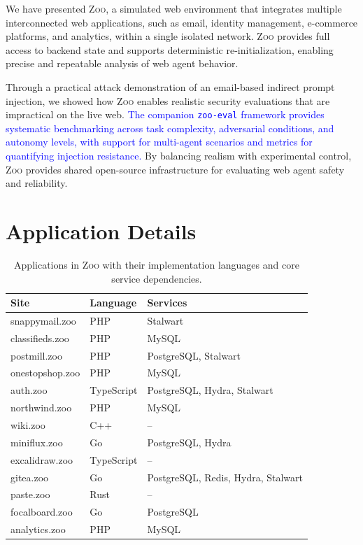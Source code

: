 \documentclass{article} %
\newcommand{\maricolor}{blue}
\newcommand{\zoo}{\textsc{Zoo}}
\begin{document}
We have presented \zoo{}, a simulated web environment that integrates multiple interconnected web applications, such as email, identity management, e-commerce platforms, and analytics, within a single isolated network.
\zoo{} provides full access to backend state and supports deterministic re-initialization, enabling precise and repeatable analysis of web agent behavior.

Through a practical attack demonstration of an email-based indirect prompt injection, we showed how \zoo{} enables realistic security evaluations that are impractical on the live web.
\textcolor{\maricolor}{The companion \texttt{zoo-eval} framework provides systematic benchmarking across task complexity, adversarial conditions, and autonomy levels, with support for multi-agent scenarios and metrics for quantifying injection resistance.}
By balancing realism with experimental control, \zoo{} provides shared open-source infrastructure for evaluating web agent safety and reliability.




\appendix
\label{appendix}

\section{Application Details}

\begin{table}[h]
\centering
\begin{tabular}{@{}lll@{}}
\toprule
\textbf{Site} & \textbf{Language} & \textbf{Services} \\
\midrule
snappymail.zoo & PHP & Stalwart \\
classifieds.zoo & PHP & MySQL \\
postmill.zoo & PHP & PostgreSQL, Stalwart \\
onestopshop.zoo & PHP & MySQL \\
auth.zoo & TypeScript & PostgreSQL, Hydra, Stalwart \\
northwind.zoo & PHP & MySQL \\
wiki.zoo & C++ & -- \\
miniflux.zoo & Go & PostgreSQL, Hydra \\
excalidraw.zoo & TypeScript & -- \\
gitea.zoo & Go & PostgreSQL, Redis, Hydra, Stalwart \\
paste.zoo & Rust & -- \\
focalboard.zoo & Go & PostgreSQL \\
analytics.zoo & PHP & MySQL \\
\bottomrule
\end{tabular}
\caption{Applications in \zoo{} with their implementation languages and core service dependencies.}
\label{tab:applications}
\end{table}
\end{document}
